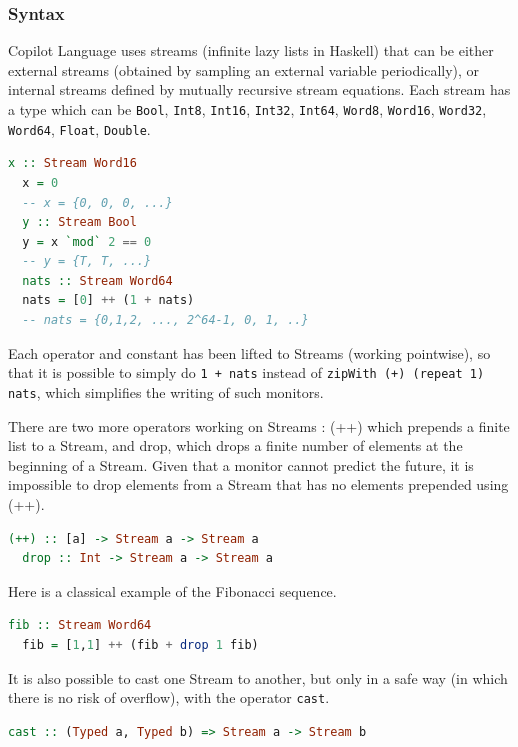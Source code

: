 \documentclass[a4paper,11pt,final]{article}
\begin{document}
  \subsubsection{Syntax}
  Copilot Language uses streams (infinite lazy lists in Haskell) that can be either external streams (obtained by sampling an external variable periodically), or internal streams defined by mutually recursive stream equations. Each stream has a type which can be \texttt{Bool}, \texttt{Int8}, \texttt{Int16}, \texttt{Int32}, \texttt{Int64}, \texttt{Word8}, \texttt{Word16}, \texttt{Word32}, \texttt{Word64}, \texttt{Float}, \texttt{Double}.
  
  \begin{lstlisting}[language=Haskell]
  x :: Stream Word16
  x = 0
  -- x = {0, 0, 0, ...}
  y :: Stream Bool
  y = x `mod` 2 == 0
  -- y = {T, T, ...}
  nats :: Stream Word64
  nats = [0] ++ (1 + nats)
  -- nats = {0,1,2, ..., 2^64-1, 0, 1, ..}  \end{lstlisting}
  
  Each operator and constant has been lifted to Streams (working pointwise), so that it is possible to simply do \texttt{1 + nats} instead of \texttt{zipWith (+) (repeat 1) nats}, which simplifies the writing of such monitors. 
  
  There are two more operators working on Streams : (++) which prepends a finite list to a Stream, and drop, which drops a finite number of elements at the beginning of a Stream. Given that a monitor cannot predict the future, it is impossible to drop elements from a Stream that has no elements prepended using (++).
  
  \begin{lstlisting}[language=Haskell]
  (++) :: [a] -> Stream a -> Stream a
  drop :: Int -> Stream a -> Stream a  \end{lstlisting}
  
  Here is a classical example of the Fibonacci sequence.
  
  \begin{lstlisting}[language=Haskell]
  fib :: Stream Word64
  fib = [1,1] ++ (fib + drop 1 fib)  \end{lstlisting}

  It is also possible to cast one Stream to another, but only in a safe way (in which there is no risk of overflow), with the operator \texttt{cast}.
  \begin{lstlisting}[language=Haskell]
  cast :: (Typed a, Typed b) => Stream a -> Stream b
  \end{lstlisting}
  
\end{document}
